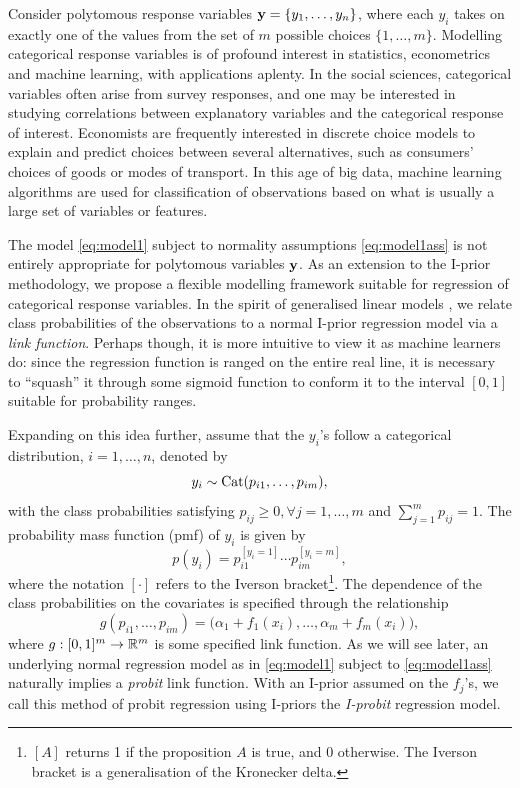 \documentclass[showframe,11pt,twoside,openright]{report}
\begin{document}
\label{chapter5}

Consider polytomous response variables ${\mathbf y} = \{y_1,\dots,y_n\}$, where each $y_i$ takes on exactly one of the values from the set of $m$ possible choices $\{1,\dots,m\}$.
Modelling categorical response variables is of profound interest in statistics, econometrics and machine learning, with applications aplenty. 
In the social sciences, categorical variables often arise from survey responses, and one may be interested in studying correlations between  explanatory variables and the categorical response of interest.
Economists are frequently interested in discrete choice models to explain and predict choices between several alternatives, such as consumers' choices of goods or modes of transport.
In this age of big data, machine learning algorithms are used for classification of observations based on what is usually a large set of variables or features.

The model \cref{eq:model1} subject to normality assumptions \cref{eq:model1ass} is not entirely appropriate for polytomous variables ${\mathbf y}$.
As an extension to the I-prior methodology, we propose a flexible modelling framework suitable for regression of categorical response variables.
In the spirit of generalised linear models \citep{mccullagh1989}, we relate class probabilities of the observations to a normal I-prior regression model via a \emph{link function}.
Perhaps though, it is more intuitive to view it as machine learners do: since the regression function is ranged on the entire real line, it is necessary to ``squash'' it through some sigmoid function to conform it to the interval $[0,1]$ suitable for probability ranges.

Expanding on this idea further, assume that the $y_i$'s follow a categorical distribution, $i=1,\dots,n$, denoted by
\[
  y_i \sim \operatorname{Cat}(p_{i1},\dots,p_{im}),
\]
with the class probabilities satisfying $p_{ij} \geq 0, \forall j=1,\dots,m$ and $\sum_{j=1}^m p_{ij} = 1$. 
The probability mass function (pmf) of $y_i$ is given by
\begin{equation*}%
  p(y_i) = p_{i1}^{[y_i = 1]} \cdots p_{im}^{[y_i = m]},
\end{equation*}
where the notation $[\cdot]$ refers to the Iverson bracket\footnote{$[A]$ returns 1 if the proposition $A$ is true, and 0 otherwise. The Iverson bracket is a generalisation of the Kronecker delta.}. 
The dependence of the class probabilities on the covariates is specified through the relationship
\[
  g(p_{i1},\dots,p_{im}) = \big(\alpha_1 + f_1(x_i), \dots, \alpha_m + f_m(x_i)\big),
\]
where $g:[0,1]^m\to\mathbb{R}^m$ is some specified link function.
As we will see later, an underlying normal regression model as in \cref{eq:model1} subject to \cref{eq:model1ass} naturally implies a \emph{probit} link function.
With an I-prior assumed on the $f_j$'s, we call this method of probit regression using I-priors the \emph{I-probit} regression model.
\end{document}
